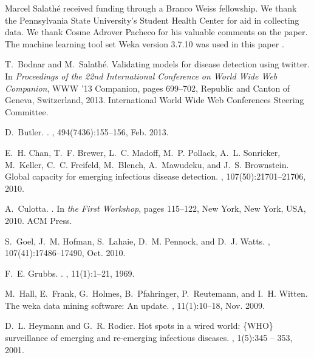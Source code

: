 \documentclass{acm_proc_article-sp}
\begin{document}
Marcel Salath\'e received funding through a Branco Weiss fellowship. We thank the Pennsylvania State University's Student Health Center for aid in collecting data. We thank Cosme Adrover Pacheco for his valuable comments on the paper. The machine learning tool set Weka version 3.7.10 was used in this paper \cite{Hall:2009ud}.
\begin{thebibliography}{10}

T.~Bodnar and M.~Salath{\'e}.
\newblock Validating models for disease detection using twitter.
\newblock In {\em Proceedings of the 22nd International Conference on World
  Wide Web Companion}, WWW '13 Companion, pages 699--702, Republic and Canton
  of Geneva, Switzerland, 2013. International World Wide Web Conferences
  Steering Committee.

D.~Butler.
.
, 494(7436):155--156, Feb. 2013.

E.~H. Chan, T.~F. Brewer, L.~C. Madoff, M.~P. Pollack, A.~L. Sonricker,
  M.~Keller, C.~C. Freifeld, M.~Blench, A.~Mawudeku, and J.~S. Brownstein.
\newblock Global capacity for emerging infectious disease detection.
,
  107(50):21701--21706, 2010.

A.~Culotta.
.
\newblock In {\em the First Workshop}, pages 115--122, New York, New York, USA,
  2010. ACM Press.

S.~Goel, J.~M. Hofman, S.~Lahaie, D.~M. Pennock, and D.~J. Watts.
, 107(41):17486--17490, Oct. 2010.

F.~E. Grubbs.
.
, 11(1):1--21, 1969.

M.~Hall, E.~Frank, G.~Holmes, B.~Pfahringer, P.~Reutemann, and I.~H. Witten.
\newblock The weka data mining software: An update.
, 11(1):10--18, Nov. 2009.

D.~L. Heymann and G.~R. Rodier.
\newblock Hot spots in a wired world: \{WHO\} surveillance of emerging and
  re-emerging infectious diseases.
, 1(5):345 -- 353, 2001.


\end{thebibliography}
\end{document}
